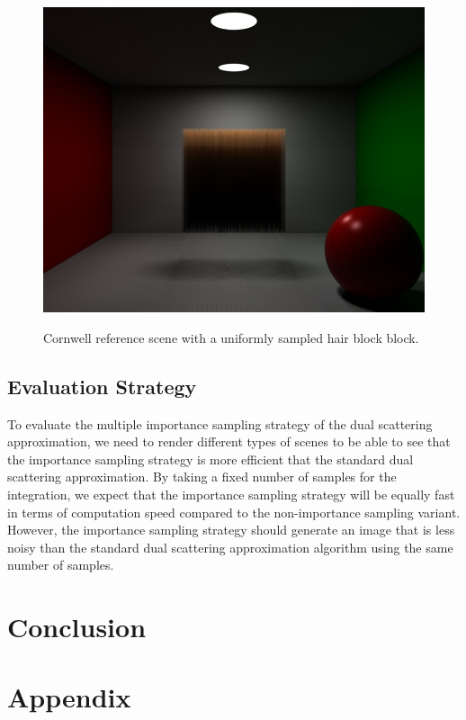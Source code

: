 \documentclass[11pt,a4paper]{report}
\begin{document}
\begin{figure}[h]
\begin{center}
\includegraphics[scale=0.35]{images/scenes/cornwell_uniform.jpg}
\label{cornwell_empty}
\caption{Cornwell reference scene with a uniformly sampled hair block block.}
\end{center}
\end{figure}



\section{Evaluation Strategy}

To evaluate the multiple importance sampling strategy of the dual scattering approximation, we need to render different types of scenes to be able to see that the importance sampling strategy is more efficient that the standard dual scattering approximation. By taking a fixed number of samples for the integration, we expect that the importance sampling strategy will be equally fast in terms of computation speed compared to the non-importance sampling variant. However, the importance sampling strategy should generate an image that is less noisy than the standard dual scattering approximation algorithm using the same number of samples. 



\chapter{Conclusion}

\chapter{Appendix}



\end{document}
